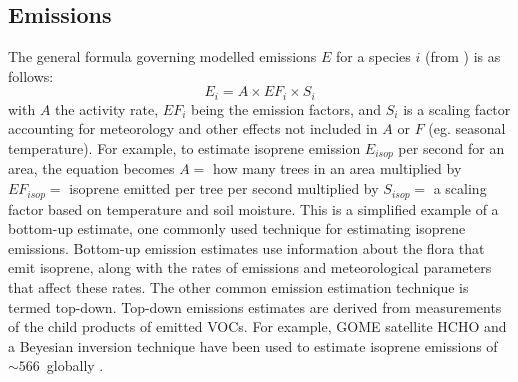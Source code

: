   \subsection{Emissions}
    \label{LR:Models:emissions}
    
    The general formula governing modelled emissions $E$ for a species $i$ (from \textcite{BrasseurJacob2017}) is as follows:
    \begin{equation}
      E_i = A \times EF_i \times S_i
    \end{equation}
    with $A$ the activity rate, $EF_i$ being the emission factors, and $S_i$ is a scaling factor accounting for meteorology and other effects not included in $A$ or $F$ (eg. seasonal temperature).
    For example, to estimate isoprene emission $E_{isop}$ per second for an area, the equation becomes $A=$ how many trees in an area multiplied by $EF_{isop}=$ isoprene emitted per tree per second multiplied by $S_{isop}=$ a scaling factor based on temperature and soil moisture.
    This is a simplified example of a bottom-up estimate, one commonly used technique for estimating isoprene emissions.
    Bottom-up emission estimates use information about the flora that emit isoprene, along with the rates of emissions and meteorological parameters that affect these rates.
    The other common emission estimation technique is termed top-down.
    Top-down emissions estimates are derived from measurements of the child 
    products of emitted VOCs.
    For example, GOME satellite HCHO and a Beyesian inversion technique have 
    been used to estimate isoprene emissions of $\sim566$\tgcpyr ~globally 
    \parencite{Shim2005}. 
    
    
